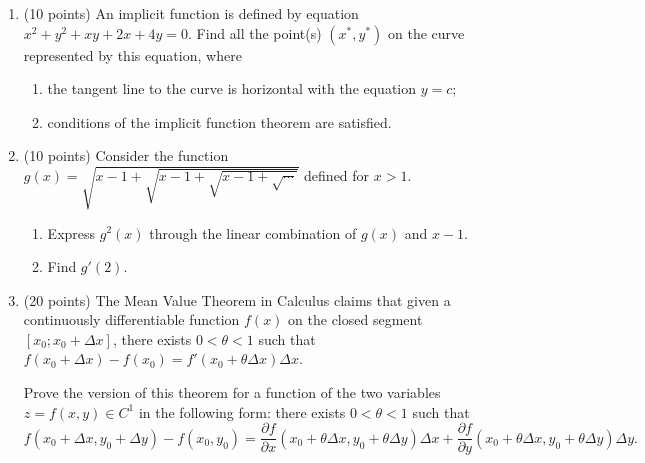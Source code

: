 \begin{enumerate}
    \item (10 points)  
    An implicit function is defined by equation $x^2 + y^2 + xy + 2x + 4y = 0$. Find all the point(s)
    $(x^*, y^*)$ on the curve represented by this equation, where
    \begin{enumerate}
      \item the tangent line to the curve is horizontal with the equation $y = c$;
      \item conditions of the implicit function theorem are satisfied.
    \end{enumerate}
    
    \item (10 points)  
    Consider the function $g(x) = \sqrt{x-1+\sqrt{x-1+\sqrt{x-1+\sqrt{\cdots}}}}$ defined for $x>1$.
    
    \begin{enumerate}
        \item Express $g^{2}(x)$ through the linear combination of $g(x)$ and $x-1$.
        \item Find $g'(2)$.
    \end{enumerate}
    
    
    
    
        
      \item (20 points) The Mean Value Theorem in Calculus claims that given a continuously differentiable function $f(x)$  
      on the closed segment $[x_0; x_0 + \Delta x]$, there exists $0 < \theta < 1$ such that $f(x_0 + \Delta x) - f(x_0) = 
      f'(x_0 + \theta \Delta x) \Delta x$. 
    
      Prove the version of this theorem for a function of the two variables $z = f(x,y) \in C^1$ in the following form: 
      there exists $0 < \theta < 1$ such that 
      \[
        f(x_0 + \Delta x, y_0 + \Delta y) - f(x_0, y_0) = \frac{\partial f}{\partial x}(x_0 + \theta \Delta x, y_0 + \theta \Delta y)\Delta x + \frac{\partial f}{\partial y}(x_0 + \theta \Delta x, y_0 + \theta \Delta y)\Delta y.  
      \]
      

\end{enumerate}
